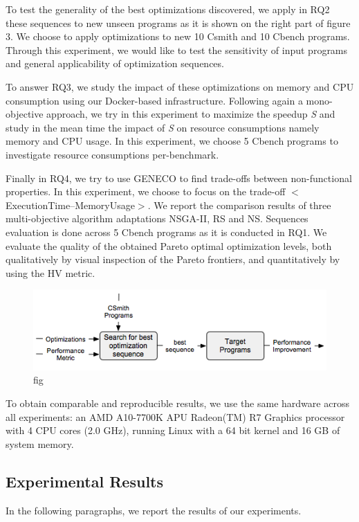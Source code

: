To test the generality of the best optimizations discovered, we apply in RQ2 these sequences to new unseen programs as it is shown on the right part of figure 3. We choose to apply optimizations to new 10 Csmith and 10 Cbench programs. Through this experiment, we would like to test the sensitivity of input programs and general applicability of optimization sequences.

To answer RQ3, we study the impact of these optimizations on memory and CPU consumption using our Docker-based infrastructure. Following again a mono-objective approach, we try in this experiment to maximize the speedup \textit{S} and study in the mean time the impact of \textit{S} on resource consumptions namely memory and CPU usage. In this experiment, we choose 5 Cbench programs to investigate resource consumptions per-benchmark.

Finally in RQ4, we try to use GENECO to find trade-offs between non-functional properties. In this experiment, we choose to focus on the trade-off $<$ExecutionTime--MemoryUsage$>$. We report the comparison results of three multi-objective algorithm adaptations NSGA-II, RS and NS. 
Sequences evaluation is done across 5 Cbench programs as it is conducted in RQ1.
We evaluate the quality of the obtained Pareto optimal optimization levels, both qualitatively by visual inspection of the Pareto frontiers, and quantitatively by using the HV metric.
\begin{figure}[h]
	\centering
	\includegraphics[width=1.\linewidth]{Ressources/sensitivity.png}
	\caption{fig}
\end{figure}

To obtain comparable and reproducible results, we use the same hardware across all experiments: an AMD A10-7700K APU Radeon(TM) R7 Graphics processor with 4 CPU cores (2.0 GHz), running Linux with a 64 bit kernel and 16 GB of system memory.


\subsection{Experimental Results}
In the following paragraphs, we report the results of our experiments.
